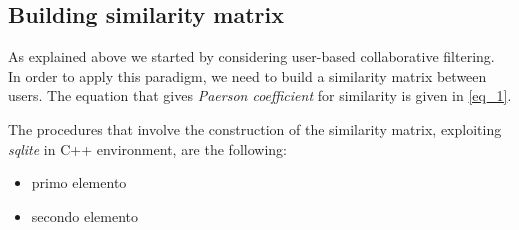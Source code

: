 \subsection{Building similarity matrix}

As explained above we started by considering user-based collaborative filtering. In order to apply this paradigm, we need to build a similarity matrix between users. The equation that gives \textit{Paerson coefficient} for similarity is given in \ref{eq_1}.

The procedures that involve the construction of the similarity matrix, exploiting \textit{sqlite} in C++ environment, are the following:

\begin{itemize}
	\item primo elemento
	\item secondo elemento
\end{itemize}